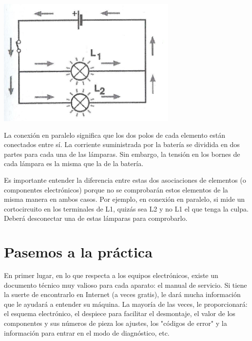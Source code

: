 \documentclass[a5paper,twoside,openany]{book}
\begin{document}
\begin{itemize}
\noindent\begin{minipage}[t]{0.5\textwidth}\vspace{0pt}
\includegraphics[width=\linewidth]{circuito-paralelo}
\end{minipage}%
\hfill%
\begin{minipage}[t]{0.45\textwidth}\vspace{0pt}
La conexión en paralelo significa que
los dos polos de cada elemento están conectados entre sí.
La corriente suministrada por la batería se
dividida en dos partes para cada una de las lámparas.
Sin embargo, la tensión en los bornes de cada lámpara es la misma que la de la batería.
\end{minipage}
\end{itemize}
Es importante entender la diferencia entre estas dos asociaciones de elementos (o componentes electrónicos) porque no se comprobarán estos elementos de la misma manera en ambos casos.
Por ejemplo, en conexión en paralelo, si mide un cortocircuito en los terminales de L1, quizás sea L2 y no L1 el que tenga la culpa. Deberá desconectar una de estas lámparas para comprobarlo.
\newpage

\chapter{Pasemos a la práctica}
En primer lugar, en lo que respecta a los equipos electrónicos, existe un documento técnico muy valioso para cada aparato: el manual de servicio.
Si tiene la suerte de encontrarlo en Internet (a veces gratis), le dará mucha información que le ayudará a entender su máquina.
La mayoría de las veces, le proporcionará: el esquema electrónico, el despiece
para facilitar el desmontaje, el valor de los componentes y sus números de pieza
los ajustes, los "códigos de error" y la información para entrar en el modo de diagnóstico, etc.
\end{document}

